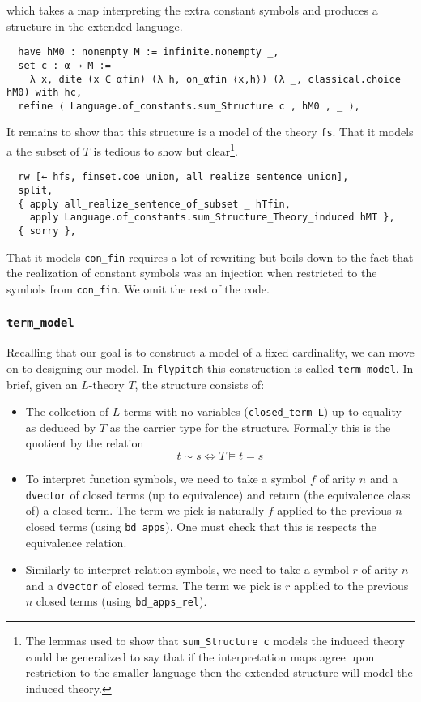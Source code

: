 \documentclass{article}
\renewcommand{\iff}{\Leftrightarrow}
\newcommand{\<}{\langle}
\renewcommand{\>}{\rangle}
\theoremstyle{definitionstyle}
\theoremstyle{exercisestyle}
\theoremstyle{remarkstyle}
\begin{document}
which takes a map interpreting the extra constant symbols
and produces a structure in the extended language.

\begin{lstlisting}
  have hM0 : nonempty M := infinite.nonempty _,
  set c : α → M :=
    λ x, dite (x ∈ αfin) (λ h, on_αfin ⟨x,h⟩) (λ _, classical.choice hM0) with hc,
  refine ⟨ Language.of_constants.sum_Structure c , hM0 , _ ⟩, \end{lstlisting}

It remains to show that this structure is a model of the theory \texttt{fs}.
That it models a the subset of $T$ is tedious to show but clear\footnote{
  The lemmas used to show that \texttt{sum\_Structure c} models the induced
  theory could be generalized to say that if the
  interpretation maps agree upon restriction to the smaller language
  then the extended structure will model the induced theory. }.

\begin{lstlisting}
  rw [← hfs, finset.coe_union, all_realize_sentence_union],
  split,
  { apply all_realize_sentence_of_subset _ hTfin,
    apply Language.of_constants.sum_Structure_Theory_induced hMT },
  { sorry }, \end{lstlisting}

That it models \texttt{con\_fin} requires a lot of rewriting but
boils down to the fact that the realization of constant symbols
was an injection when restricted to the symbols from \texttt{con\_fin}.
We omit the rest of the code.

\subsubsection{\texttt{term\_model}}

Recalling that our goal is to construct a model of a fixed cardinality,
we can move on to designing our model.
In \texttt{flypitch} this construction is called \texttt{term\_model}.
In brief, given an $L$-theory $T$, the structure consists of:
\begin{itemize}
  \item The collection of $L$-terms with no variables (\texttt{closed\_term L})
        up to equality as deduced by $T$ as the
        carrier type for the structure.
        Formally this is the quotient by the relation
        \[ t \sim s \iff T \vDash t = s \]
  \item To interpret function symbols, we need to take a
        symbol $f$ of arity $n$ and a \texttt{dvector} of closed terms
        (up to equivalence) and return (the equivalence class of) a closed term.
        The term we pick is naturally $f$
        applied to the previous $n$ closed terms (using \texttt{bd\_apps}).
        One must check that this is respects the equivalence relation.
  \item Similarly to interpret relation symbols, we need to take a
        symbol $r$ of arity $n$ and a \texttt{dvector} of closed terms.
        The term we pick is $r$ applied to the previous $n$ closed terms
        (using \texttt{bd\_apps\_rel}).
\end{itemize}
\end{document}
